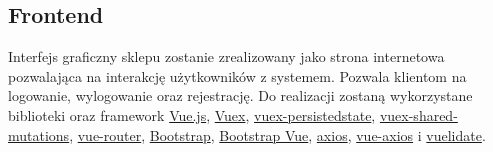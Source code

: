 \documentclass[11pt,a4paper,twoside]{article}
\begin{document}
\subsection{Frontend}
Interfejs graficzny sklepu zostanie zrealizowany jako strona internetowa pozwalająca na interakcję użytkowników z systemem. Pozwala klientom na logowanie, wylogowanie oraz rejestrację. Do realizacji zostaną wykorzystane biblioteki oraz framework \href{https://vuejs.org/}{Vue.js}, \href{https://vuex.vuejs.org/en/}{Vuex}, \href{https://www.npmjs.com/package/vuex-persistedstate}{vuex-persistedstate}, \href{https://www.npmjs.com/package/vuex-shared-mutations}{vuex-shared-mutations}, \href{https://www.npmjs.com/package/vue-router}{vue-router}, \href{https://getbootstrap.com/}{Bootstrap}, \href{https://bootstrap-vue.js.org/}{Bootstrap Vue}, \href{https://www.npmjs.com/package/axios}{axios}, \href{https://www.npmjs.com/package/vue-axios}{vue-axios} i  \href{https://www.npmjs.com/package/vuelidate}{vuelidate}.
\end{document}
